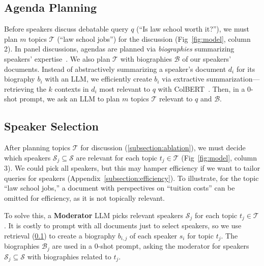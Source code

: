 \subsection{Agenda Planning} \label{subsection:agenda}

Before speakers discuss debatable query $q$ (``Is law school worth it?''), we must plan $m$ topics $\mathcal{T}$ (``law school jobs'') for the discussion (Fig~\ref{fig:model}, column 2).
In panel discussions, agendas are planned via \textit{biographies} summarizing speakers' expertise~\cite{pigeonholelive_panel_discussions}.
We also plan $\mathcal{T}$ with biographies $\mathcal{B}$ of our speakers' documents.
Instead of abstractively summarizing a speaker's document $d_i$ for its biography $b_i$ with an LLM, we efficiently create $b_i$ via extractive summarization---retrieving the $k$ contexts in $d_i$ most relevant to $q$ with ColBERT~\cite{khattab2020colbert}.
Then, in a 0-shot prompt, we ask an LLM to plan $m$ topics $\mathcal{T}$ relevant to $q$ and $\mathcal{B}$.

\subsection{Speaker Selection} \label{subsection:moderator}

After planning topics $\mathcal{T}$ for discussion (\cref{subsection:ablation}), we must decide which speakers $\mathcal{S}_j \subseteq \mathcal{S}$ are relevant for each topic $t_j \in \mathcal{T}$ (Fig~\ref{fig:model}, column 3).
We could pick all speakers, but this may hamper efficiency if we want to tailor queries for speakers (Appendix~\ref{subsection:efficiency}).
To illustrate, for the topic ``law school jobs,'' a document with perspectives on ``tuition costs'' can be omitted for efficiency, as it is not topically relevant.  

To solve this, a \textbf{Moderator} LLM picks relevant speakers $\mathcal{S}_{j}$ for each topic $t_j \in \mathcal{T}$. 
It is costly to prompt with all documents just to select speakers, so we use retrieval (\cref{subsection:agenda}) to create a biography $b_{i, j}$ of each speaker $s_i$ for topic $t_j$.
The biographies $\mathcal{B}_j$ are used in a 0-shot prompt, asking the moderator for speakers $\mathcal{S}_{j} \subseteq \mathcal{S}$ with biographies related to $t_j$.

